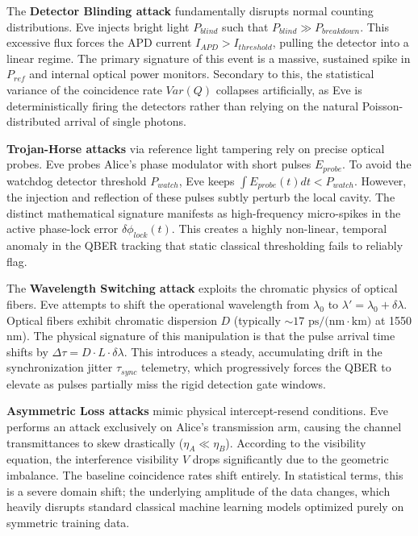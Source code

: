 \documentclass[10pt, journal, letterpaper, twocolumn]{IEEEtran}
\begin{document}
The \textbf{Detector Blinding attack} fundamentally disrupts normal counting distributions. Eve injects bright light $P_{blind}$ such that $P_{blind} \gg P_{breakdown}$. This excessive flux forces the APD current $I_{APD} > I_{threshold}$, pulling the detector into a linear regime. The primary signature of this event is a massive, sustained spike in $P_{ref}$ and internal optical power monitors. Secondary to this, the statistical variance of the coincidence rate $Var(Q)$ collapses artificially, as Eve is deterministically firing the detectors rather than relying on the natural Poisson-distributed arrival of single photons.

\textbf{Trojan-Horse attacks} via reference light tampering rely on precise optical probes. Eve probes Alice's phase modulator with short pulses $E_{probe}$. To avoid the watchdog detector threshold $P_{watch}$, Eve keeps $\int E_{probe}(t) dt < P_{watch}$. However, the injection and reflection of these pulses subtly perturb the local cavity. The distinct mathematical signature manifests as high-frequency micro-spikes in the active phase-lock error $\delta \phi_{lock}(t)$. This creates a highly non-linear, temporal anomaly in the QBER tracking that static classical thresholding fails to reliably flag.

The \textbf{Wavelength Switching attack} exploits the chromatic physics of optical fibers. Eve attempts to shift the operational wavelength from $\lambda_0$ to $\lambda' = \lambda_0 + \delta \lambda$. Optical fibers exhibit chromatic dispersion $D$ (typically $\sim 17 \text{ ps/(nm}\cdot\text{km)}$ at 1550 nm). The physical signature of this manipulation is that the pulse arrival time shifts by $\Delta \tau = D \cdot L \cdot \delta \lambda$. This introduces a steady, accumulating drift in the synchronization jitter $\tau_{sync}$ telemetry, which progressively forces the QBER to elevate as pulses partially miss the rigid detection gate windows.

\textbf{Asymmetric Loss attacks} mimic physical intercept-resend conditions. Eve performs an attack exclusively on Alice's transmission arm, causing the channel transmittances to skew drastically ($\eta_A \ll \eta_B$). According to the visibility equation, the interference visibility $V$ drops significantly due to the geometric imbalance. The baseline coincidence rates shift entirely. In statistical terms, this is a severe domain shift; the underlying amplitude of the data changes, which heavily disrupts standard classical machine learning models optimized purely on symmetric training data.
\end{document}
